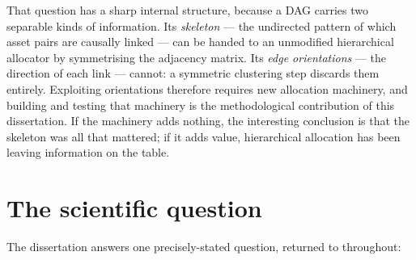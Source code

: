 That question has a sharp internal structure, because a DAG carries two
separable kinds of information. Its \emph{skeleton} --- the undirected pattern
of which asset pairs are causally linked --- can be handed to an unmodified
hierarchical allocator by symmetrising the adjacency matrix. Its \emph{edge
orientations} --- the direction of each link --- cannot: a symmetric
clustering step discards them entirely. Exploiting orientations therefore
requires new allocation machinery, and building and testing that machinery is
the methodological contribution of this dissertation. If the machinery adds
nothing, the interesting conclusion is that the skeleton was all that
mattered; if it adds value, hierarchical allocation has been leaving
information on the table.

\section{The scientific question}
\label{sec:question}

The dissertation answers one precisely-stated question, returned to
throughout:

\begin{quote}
\noindent{}
\end{quote}

